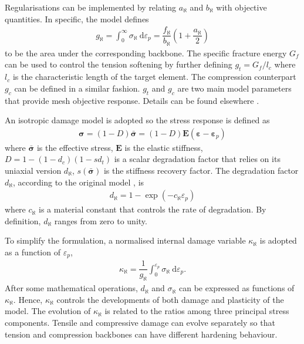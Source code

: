 \documentclass[3p,sort&compress,review,11pt,fleqn]{elsarticle}
\newcommand*{\md}[1]{\mathrm{d}#1}
\newcommand*{\mathbold}[1]{\bm{#1}}
\begin{document}
Regularisations can be implemented by relating $a_\aleph$ and $b_\aleph$ with objective quantities. In specific, the model defines
\begin{gather}
g_\aleph=\int_0^\infty\sigma_\aleph~\md{\varepsilon_p}=\dfrac{f_\aleph}{b_\aleph}\left(1+\dfrac{a_\aleph}{2}\right)
\end{gather}
to be the area under the corresponding backbone. The specific fracture energy $G_f$ can be used to control the tension softening by further defining $g_t=G_f/l_c$ where $l_c$ is the characteristic length of the target element. The compression counterpart $g_c$ can be defined in a similar fashion. $g_t$ and $g_c$ are two main model parameters that provide mesh objective response. Details can be found elsewhere \citep{Lubliner1989}.

An isotropic damage model is adopted so the stress response is defined as
\begin{gather}
\mathbold{\sigma}=\left(1-D\right)\bar{\mathbold{\sigma}}=\left(1-D\right)\mathbold{E}\left(\mathbold{\varepsilon}-\mathbold{\varepsilon}_p\right)
\end{gather}
where $\bar{\mathbold{\sigma}}$ is the effective stress, $\mathbold{E}$ is the elastic stiffness, $D=1-\left(1-d_c\right)\left(1-sd_t\right)$ is a scalar degradation factor that relies on its uniaxial version $d_\aleph$, $s(\bar{\mathbold{\sigma}})$ is the stiffness recovery factor. The degradation factor $d_\aleph$, according to the original model \citep{Lee1998}, is
\begin{gather}
d_\aleph=1-\exp\left(-c_\aleph\varepsilon_p\right)
\end{gather}
where $c_\aleph$ is a material constant that controls the rate of degradation. By definition, $d_\aleph$ ranges from zero to unity.

To simplify the formulation, a normalised internal damage variable $\kappa_\aleph$ is adopted as a function of $\varepsilon_p$,
\begin{gather}
\kappa_\aleph=\dfrac{1}{g_\aleph}\int_0^{\varepsilon_p}\sigma_\aleph~\md{\varepsilon_p}.
\end{gather}
After some mathematical operations, $d_\aleph$ and $\sigma_\aleph$ can be expressed as functions of $\kappa_\aleph$. Hence, $\kappa_\aleph$ controls the developments of both damage and plasticity of the model. The evolution of $\kappa_\aleph$ is related to the ratios among three principal stress components. Tensile and compressive damage can evolve separately so that tension and compression backbones can have different hardening behaviour.
\end{document}

